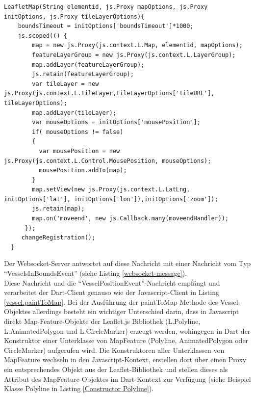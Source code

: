 \begin{lstlisting}[caption=Konstruktor des LeafletMap-Objektes mit Zugriff auf den Javascript-Kontext, label=LeafletMapConstructor]
LeafletMap(String elementid, js.Proxy mapOptions, js.Proxy initOptions, js.Proxy tileLayerOptions){
    boundsTimeout = initOptions['boundsTimeout']*1000;
    js.scoped(() {
        map = new js.Proxy(js.context.L.Map, elementid, mapOptions);
        featureLayerGroup = new js.Proxy(js.context.L.LayerGroup);
        map.addLayer(featureLayerGroup);
        js.retain(featureLayerGroup);
        var tileLayer = new js.Proxy(js.context.L.TileLayer,tileLayerOptions['tileURL'], tileLayerOptions);
        map.addLayer(tileLayer);
        var mouseOptions = initOptions['mousePosition'];
        if( mouseOptions != false)
        {
          var mousePosition = new js.Proxy(js.context.L.Control.MousePosition, mouseOptions);
          mousePosition.addTo(map);
        }
        map.setView(new js.Proxy(js.context.L.LatLng, initOptions['lat'], initOptions['lon']),initOptions['zoom']);
        js.retain(map);
        map.on('moveend', new js.Callback.many(moveendHandler));
      });
     changeRegistration();
  }
\end{lstlisting}
Der Websocket-Server antwortet auf diese Nachricht mit einer Nachricht vom Typ “VesselsInBoundsEvent” (siehe Listing \ref{websocket-message}).\\
Diese Nachricht und die “VesselPositionEvent”-Nachricht empfängt und verarbeitet der Dart-Client genauso wie der Javascript-Client in Listing \ref{vessel.paintToMap}. Bei der Ausführung der paintToMap-Methode des Vessel-Objektes allerdings besteht ein wichtiger Unterschied darin, dass in Javascript direkt Map-Feature-Objekte der Leaflet.js Bibliothek (L.Polyline, L.AnimatedPolygon und L.CircleMarker) erzeugt werden, wohingegen in Dart der Konstruktor einer Unterklasse von MapFeature (Polyline, AnimatedPolygon oder CircleMarker) aufgerufen wird. Die Konstruktoren aller Unterklassen von MapFeature wechseln in den Javascript-Kontext, erstellen dort über einen Proxy ein entsprechendes Objekt aus der Leaflet-Bibliothek und stellen dieses als Attribut des MapFeature-Objektes im Dart-Kontext zur Verfügung (siehe Beispiel Klasse Polyline in Listing \ref{Constructor Polyline}).


